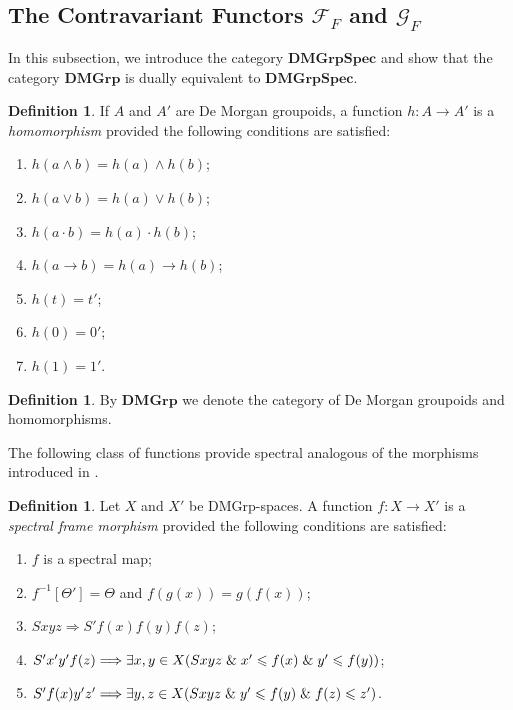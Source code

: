 \documentclass{amsart}
\theoremstyle{plain}
\theoremstyle{definition}
\newtheorem{definition}[theorem]{Definition}
\begin{document}
\subsection{The Contravariant Functors $\mathcal{F}_F$ and $\mathcal{G}_F$} In this subsection, we introduce the category $\mathbf{DMGrpSpec}$ and show that the category $\mathbf{DMGrp}$ is dually equivalent to $\mathbf{DMGrpSpec}$. 
\begin{definition}
    If $A$ and $A'$ are De Morgan groupoids, a function $h\colon A\to A'$ is a \emph{homomorphism} provided the following conditions are satisfied:  
    \begin{enumerate}
        \item $h(a\wedge b)=h(a)\wedge h(b)$; 
        \item $h(a\vee b)=h(a)\vee h(b)$; 
        \item $h(a\cdot b)=h(a)\cdot h(b)$; 
        \item $h(a\rightarrow b)=h(a)\rightarrow h(b)$; 
        \item $h(t)=t'$; 
        \item $h(0)=0'$; 
        \item $h(1)=1'$. 
    \end{enumerate}
\end{definition}
\begin{definition}
    By $\mathbf{DMGrp}$ we denote the category of De Morgan groupoids and homomorphisms. 
\end{definition}
The following class of functions provide spectral analogous of the morphisms introduced in \cite{urq}. 
\begin{definition}\label{spectral frame morphisms 2}
    Let $X$ and $X'$ be DMGrp-spaces. A function $f\colon X\to X'$ is a \emph{spectral frame morphism} provided the following conditions are satisfied: 
    \begin{enumerate}
        \item $f$ is a spectral map;
        \item $f^{-1}[\Theta']=\Theta$ and $f(g(x))=g(f(x))$;  
        \item $Sxyz\Longrightarrow S'f(x)f(y)f(z)$; 
        \item $S'x'y'f(z)\Longrightarrow\exists x,y\in X(Sxyz\hspace{.1cm}\&\hspace{.1cm}x'\leqslant f(x)\hspace{.1cm}\&\hspace{.1cm}y'\leqslant f(y))$; 
        \item $S'f(x)y'z'\Longrightarrow\exists y,z\in X(Sxyz\hspace{.1cm}\&\hspace{.1cm}y'\leqslant f(y)\hspace{.1cm}\&\hspace{.1cm}f(z)\leqslant z')$. 
    \end{enumerate}
\end{definition}
\end{document}
